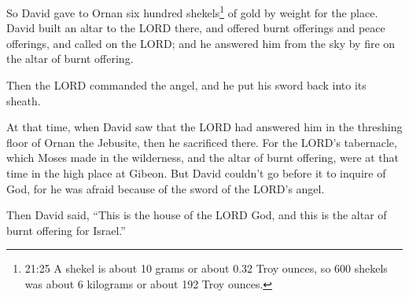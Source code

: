 \myverse{}So David gave to Ornan six hundred shekels\footnote{21:25 A shekel is about 10 grams or about 0.32 Troy ounces, so 600 shekels was about 6 kilograms or
	about 192 Troy ounces.} of gold by weight for the place.
\myverse{}David built an altar to the LORD there, and offered burnt offerings and peace
offerings, and called on the LORD; and he answered him from the sky by fire on the altar of burnt offering.

\myverse{}Then the LORD commanded the angel, and he put his sword back
into its sheath.

\myverse{}At that time, when David saw that the LORD had answered him
in the threshing floor of Ornan the Jebusite, then he sacrificed there.
\myverse{}For the LORD’s tabernacle, which Moses made in the wilderness, and the altar
of burnt offering, were at that time in the high place at Gibeon.
\myverse{}But David couldn’t go before it to inquire of God, for he was afraid because
of the sword of the LORD’s angel.


\mychapter{} \myverse*{}Then David said, “This is the house of the LORD God, and this
is the altar of burnt offering for Israel.”

